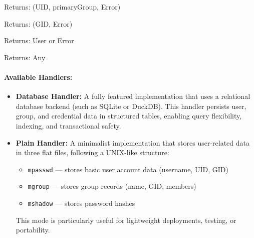 \begin{algorithm}[H]
\caption{Abstract Handler Interface (pseudocode)}
\begin{algorithmic}
\EndFunction

  \State Returns: (UID, primaryGroup, Error)
\EndFunction

\EndFunction

\EndFunction

\EndFunction

  \State Returns: (GID, Error)
\EndFunction

\EndFunction

\EndFunction

\EndFunction

  \State Returns: User or Error
\EndFunction

  \State Returns: Any
\EndFunction

\EndFunction

\EndFunction
\end{algorithmic}
\end{algorithm}



\paragraph{Available Handlers:}
\begin{itemize}
    \item \textbf{Database Handler:}  
    A fully featured implementation that uses a relational database backend (such as SQLite or DuckDB). This handler persists user, group, and credential data in structured tables, enabling query flexibility, indexing, and transactional safety.

    \item \textbf{Plain Handler:}  
    A minimalist implementation that stores user-related data in three flat files, following a UNIX-like structure:
    \begin{itemize}
        \item \texttt{mpasswd} — stores basic user account data (username, UID, GID)
        \item \texttt{mgroup} — stores group records (name, GID, members)
        \item \texttt{mshadow} — stores password hashes
    \end{itemize}
    This mode is particularly useful for lightweight deployments, testing, or portability.
\end{itemize}

